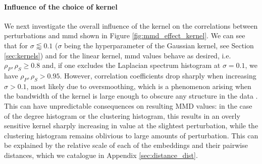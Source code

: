 \paragraph{Influence of the choice of kernel} We next investigate the overall
influence of the kernel on the correlations between perturbations and
\acrshort{mmd} shown in Figure \ref{fig:mmd_effect_kernel}. We can see that for
$\sigma\lessapprox 0.1$ ($\sigma$ being the hyperparameter of the Gaussian
kernel, see Section \ref{sec:kernels}) and for the linear kernel, \acrshort{mmd}
values behave as desired, i.e. $\rho_P,\rho_S\geq 0.8$ and, if one excludes the
Laplacian spectrum histogram at $\sigma=0.1$, we have $\rho_P,\rho_S>0.95$.
However, correlation coefficients drop sharply when increasing $\sigma>0.1$,
most likely due to oversmoothing, which is a phenomenon arising when the
bandwidth of the kernel is large enough to obscure any structure in the data
\citep{hwang1994nonparametric}. This can have unpredictable consequences on
resulting MMD values: in the case of the degree histogram or the clustering
histogram, this results in an overly sensitive kernel sharply increasing in
value at the slightest perturbation, while the clustering histogram remains
oblivious to large amounts of perturbation. This can be explained by the
relative scale of each of the embeddings and their pairwise distances, which we
catalogue in Appendix \ref{sec:distance_dist}. %

